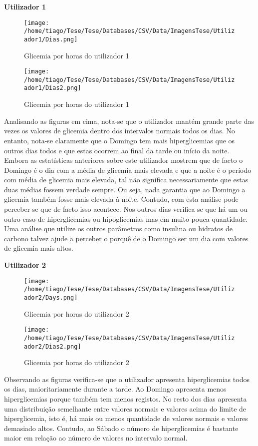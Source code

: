 \textbf{Utilizador 1}

\begin{figure}[H]
\centering
\texttt{[image: /home/tiago/Tese/Tese/Databases/CSV/Data/ImagensTese/Utilizador1/Dias.png]}
\caption{Glicemia por horas do utilizador 1}
\end{figure}

\begin{figure}[H]
\centering
\texttt{[image: /home/tiago/Tese/Tese/Databases/CSV/Data/ImagensTese/Utilizador1/Dias2.png]}
\caption{Glicemia por horas do utilizador 1}
\end{figure}

Analisando as figuras em cima, nota-se que o utilizador mantém grande parte das vezes os valores de glicemia dentro dos intervalos normais todos os dias. No entanto, nota-se claramente que o Domingo tem mais hiperglicemias que os outros dias todos e que estas ocorrem ao final da tarde ou início da noite. Embora as estatísticas anteriores sobre este utilizador mostrem que de facto o Domingo é o dia com a média de glicemia mais elevada e que a noite é o período com média de glicemia mais elevada, tal não significa necessariamente que estas duas médias fossem verdade sempre. Ou seja, nada garantia que ao Domingo a glicemia também fosse mais elevada à noite. Contudo, com esta análise pode perceber-se que de facto isso acontece. Nos outros dias verifica-se que há um ou outro caso de hiperglicemias ou hipoglicemias mas em muito pouca quantidade. Uma análise que utilize os outros parâmetros como insulina ou hidratos de carbono talvez ajude a perceber o porquê de o Domingo ser um dia com valores de glicemia mais altos. 

\textbf{Utilizador 2}

\begin{figure}[H]
\centering
\texttt{[image: /home/tiago/Tese/Tese/Databases/CSV/Data/ImagensTese/Utilizador2/Days.png]}
\caption{Glicemia por horas do utilizador 2}
\end{figure}

\begin{figure}[H]
\centering
\texttt{[image: /home/tiago/Tese/Tese/Databases/CSV/Data/ImagensTese/Utilizador2/Dias2.png]}
\caption{Glicemia por horas do utilizador 2}
\end{figure}

Observando as figuras verifica-se que o utilizador apresenta hiperglicemias todos os dias, maioritariamente durante a tarde. Ao Domingo apresenta menos hiperglicemias porque também tem menos registos. No resto dos dias apresenta uma distribuição semelhante entre valores normais e valores acima do limite de hiperglicemia, isto é, há mais ou menos quantidade de valores normais e valores demasiado altos. Contudo, ao Sábado o número de hiperglicemias é bastante maior em relação ao número de valores no intervalo normal.



